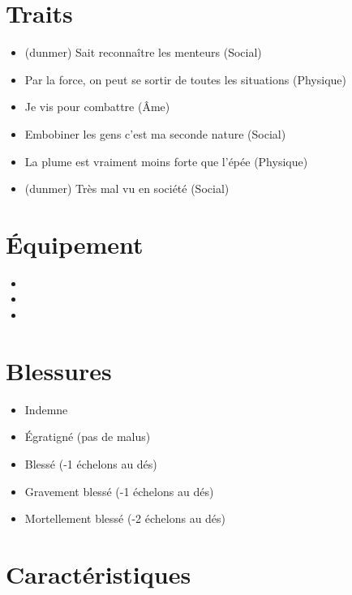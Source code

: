 \documentclass{Tamriel}
\begin{document}
\begin{multicols*}{2}
\raggedcolumns

        \section*{Traits}

        \begin{itemize}
        \item (dunmer) Sait reconnaître les menteurs (Social)
        \item Par la force, on peut se sortir de toutes les situations (Physique)
        \item Je vis pour combattre (Âme)
        \item Embobiner les gens c'est ma seconde nature (Social)
        \item La plume est vraiment moins forte que l'épée (Physique)
        \item (dunmer) Très mal vu en société (Social)
        \end{itemize}
        
        \section*{Équipement}

        \begin{itemize}
        \item 
        \item 
        \item 
        \end{itemize}
        
        \section*{Blessures}

	\begin{itemize}
	\item Indemne
	\item Égratigné (pas de malus)
	\item Blessé (-1 échelons au dés)
	\item Gravement blessé (-1 échelons au dés)
	\item Mortellement blessé (-2 échelons au dés)
        \end{itemize}

        \columnbreak
        
        \section*{Caractéristiques}


\end{multicols*}
\end{document}
